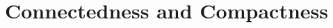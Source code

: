 \documentclass[../main.tex]{subfiles}
\begin{document}
\chapter{Connectedness and Compactness}
%
\todo{}
\end{document}
